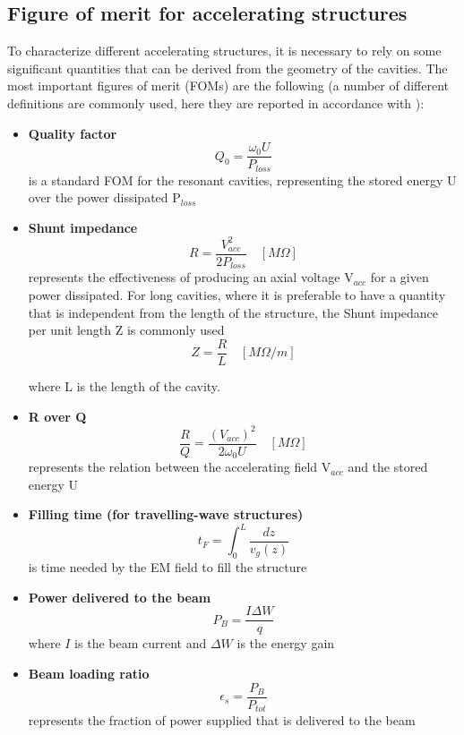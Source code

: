 \subsection[Figure of merit for accelerating structures]{Figure of merit for accelerating structures}

To characterize different accelerating structures, it is necessary to rely on some significant quantities that can be derived from the geometry of the cavities. The most important figures of merit (FOMs) are the following (a number of different definitions are commonly used, here they are reported in accordance with \cite{TECKER:RFCAS}):
\begin{itemize}

\item \textbf{Quality factor} 
\begin{equation}
Q_0 = \frac{\omega_0 U}{P_{loss}} 
\end{equation}
is a standard FOM for the resonant cavities, representing the stored energy U over the power dissipated P$_{loss}$

\item \textbf{Shunt impedance} 
\begin{equation}
R = \frac{V_{acc}^2}{2P_{loss}}  \quad [M\Omega]
\end{equation}
represents the effectiveness of producing an axial voltage V$_{acc}$ for a given power dissipated. For long cavities, where it is preferable to have a quantity that is independent from the length of the structure, the Shunt impedance per unit length
 Z is commonly used 
\begin{equation}
Z = \frac{R}{L}  \quad [M\Omega / m]
\end{equation}

where L is the length of the cavity.

\item \textbf{R over Q} 
\begin{equation}
\frac{R}{Q} = \frac{(V_{acc})^2}{2\omega_0 U}  \quad [M\Omega]
\end{equation}
represents the relation between the accelerating field V$_{acc}$ and the stored energy U


\item \textbf{Filling time (for travelling-wave structures)}
\begin{equation}
t_F = \int_0^L \frac{dz}{v_g (z)}
\end{equation}
is time needed by the EM field to fill the structure

\item \textbf{Power delivered to the beam}
\begin{equation}
P_B = \frac{I \Delta W}{q}
\end{equation}
where $I$ is the beam current and $\Delta W$ is the energy gain

\item \textbf{Beam loading ratio}
\begin{equation}
\epsilon_s = \frac{P_B}{P_{tot}}
\end{equation}
represents the fraction of power supplied that is delivered to the beam

\end{itemize}



